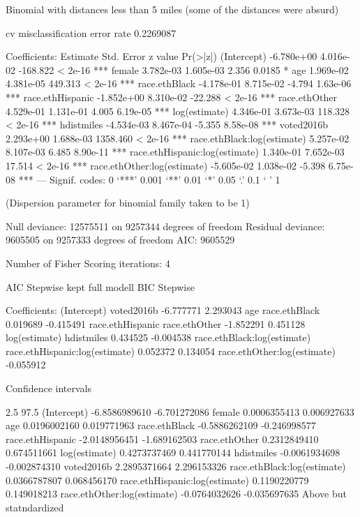 
Binomial with distances less than 5 miles (some of the distances were absurd)

cv misclassification error rate 0.2269087

Coefficients:
                                 Estimate Std. Error  z value Pr(>|z|)
(Intercept)                    -6.780e+00  4.016e-02 -168.822  < 2e-16 ***
female                          3.782e-03  1.605e-03    2.356   0.0185 *
age                             1.969e-02  4.381e-05  449.313  < 2e-16 ***
race.ethBlack                  -4.178e-01  8.715e-02   -4.794 1.63e-06 ***
race.ethHispanic               -1.852e+00  8.310e-02  -22.288  < 2e-16 ***
race.ethOther                   4.529e-01  1.131e-01    4.005 6.19e-05 ***
log(estimate)                   4.346e-01  3.673e-03  118.328  < 2e-16 ***
hdistmiles                     -4.534e-03  8.467e-04   -5.355 8.58e-08 ***
voted2016b                      2.293e+00  1.688e-03 1358.460  < 2e-16 ***
race.ethBlack:log(estimate)     5.257e-02  8.107e-03    6.485 8.90e-11 ***
race.ethHispanic:log(estimate)  1.340e-01  7.652e-03   17.514  < 2e-16 ***
race.ethOther:log(estimate)    -5.605e-02  1.038e-02   -5.398 6.75e-08 ***
---
Signif. codes:  0 ‘***’ 0.001 ‘**’ 0.01 ‘*’ 0.05 ‘.’ 0.1 ‘ ’ 1

(Dispersion parameter for binomial family taken to be 1)

    Null deviance: 12575511  on 9257344  degrees of freedom
Residual deviance:  9605505  on 9257333  degrees of freedom
AIC: 9605529

Number of Fisher Scoring iterations: 4

AIC Stepwise kept full modell
BIC Stepwise

Coefficients:
                   (Intercept)                      voted2016b
                     -6.777771                        2.293043
                           age                   race.ethBlack
                      0.019689                       -0.415491
              race.ethHispanic                   race.ethOther
                     -1.852291                        0.451128
                 log(estimate)                      hdistmiles
                      0.434525                       -0.004538
   race.ethBlack:log(estimate)  race.ethHispanic:log(estimate)
                      0.052372                        0.134054
   race.ethOther:log(estimate)
                     -0.055912


Confidence intervals

                                    2.5        97.5
(Intercept)                    -6.8586989610 -6.701272086
female                          0.0006355413  0.006927633
age                             0.0196002160  0.019771963
race.ethBlack                  -0.5886262109 -0.246998577
race.ethHispanic               -2.0148956451 -1.689162503
race.ethOther                   0.2312849410  0.674511661
log(estimate)                   0.4273737469  0.441770144
hdistmiles                     -0.0061934698 -0.002874310
voted2016b                      2.2895371664  2.296153326
race.ethBlack:log(estimate)     0.0366787807  0.068456170
race.ethHispanic:log(estimate)  0.1190220779  0.149018213
race.ethOther:log(estimate)    -0.0764032626 -0.035697635
Above but statndardized

